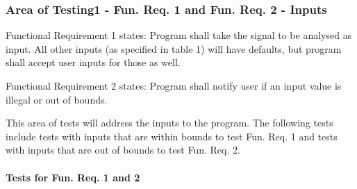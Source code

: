 \documentclass[12pt, titlepage]{article}
\begin{document}


		
\subsubsection{Area of Testing1 - Fun. Req. 1 and Fun. Req. 2 - Inputs}\label{test_input}

Functional Requirement 1 states: Program shall take the signal to be analysed as input. All other inputs (as specified in table 1) will have defaults, but program shall accept user inputs for those as well.

Functional Requirement 2 states: Program shall notify user if an input value is illegal or out of bounds.

This area of tests will address the inputs to the program. The following tests include  tests with inputs that are within bounds to test Fun. Req. 1 and tests with inputs that are out of bounds to test Fun. Req. 2.

\paragraph{Tests for Fun. Req. 1 and 2}
\end{document}
